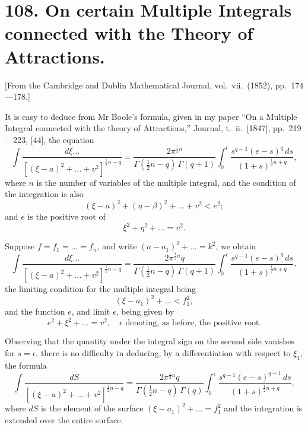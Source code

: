 \documentclass[11pt,a4paper]{book}
\begin{document}
\section*{108. On certain Multiple Integrals connected with the Theory of Attractions.}

[From the Cambridge and Dublin Mathematical Journal, vol.\ vii.\ (1852), pp.\ 174---178.]

It is easy to deduce from Mr Boole's formula, given in my paper ``On a Multiple Integral connected with the theory of Attractions,'' Journal, t.\ ii.\ [1847], pp.\ 219---223, [44], the equation
\[\int \frac{d\xi \ldots}{[(\xi-a)^2 + \ldots + v^2]^{\frac{1}{2}n-q}} = \frac{2\pi^{\frac{1}{2}n}}{\Gamma(\tfrac{1}{2}n-q)\,\Gamma(q+1)} \int_0^{\epsilon} \frac{s^{q-1}(e-s)^q\,ds}{(1+s)^{\frac{1}{2}n+q}},\]
where $n$ is the number of variables of the multiple integral, and the condition of the integration is also
\[(\xi-a)^2 + (\eta-\beta)^2 + \ldots + v^2 < e^2;\]
and $e$ is the positive root of
\[\xi^2 + \eta^2 + \ldots = v^2.\]

Suppose $f = f_1 = \ldots = f_n$, and write $(a-a_1)^2 + \ldots = k^2$, we obtain
\[\int \frac{d\xi \ldots}{[(\xi-a)^2 + \ldots + v^2]^{\frac{1}{2}n-q}} = \frac{2\pi^{\frac{1}{2}n}q}{\Gamma(\tfrac{1}{2}n-q)\,\Gamma(q+1)} \int_0^{\epsilon} \frac{s^{q-1}(e-s)^q\,ds}{(1+s)^{\frac{1}{2}n+q}},\]
the limiting condition for the multiple integral being
\[(\xi-a_1)^2 + \ldots < f_1^2,\]
and the function $e$, and limit $\epsilon$, being given by
\[e^2 + \xi^2 + \ldots = v^2, \quad \epsilon \text{ denoting, as before, the positive root.}\]

Observing that the quantity under the integral sign on the second side vanishes for $s = \epsilon$, there is no difficulty in deducing, by a differentiation with respect to $\xi_1$, the formula
\[\int \frac{dS}{[(\xi-a)^2 + \ldots + v^2]^{\frac{1}{2}n-q}} = \frac{2\pi^{\frac{1}{2}n}q}{\Gamma(\tfrac{1}{2}n-q)\,\Gamma(q)} \int_0^{\epsilon} \frac{s^{q-1}(e-s)^{q-1}\,ds}{(1+s)^{\frac{1}{2}n+q}},\]
where $dS$ is the element of the surface $(\xi-a_1)^2 + \ldots = f_1^2$ and the integration is extended over the entire surface.
\end{document}
